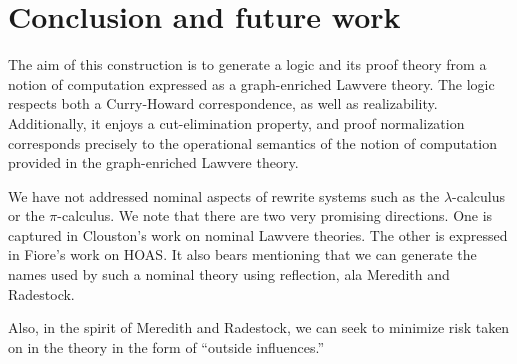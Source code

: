 \documentclass{llncs}
\renewcommand{\:}{\colon}
\newcommand{\pic}{$\pi$-calculus}
\begin{document}











  

\section{Conclusion and future work}

The aim of this construction is to generate a logic and its proof
theory from a notion of computation expressed as a graph-enriched
Lawvere theory. The logic respects both a Curry-Howard correspondence,
as well as realizability. Additionally, it enjoys a cut-elimination
property, and proof normalization corresponds precisely to the
operational semantics of the notion of computation provided in the
graph-enriched Lawvere theory.

We have not addressed nominal aspects of rewrite systems such as the
$\lambda$-calculus or the {\pic}. We note that there are two very
promising directions. One is captured in Clouston’s work on nominal
Lawvere theories. The other is expressed in Fiore’s work on HOAS. It
also bears mentioning that we can generate the names used by such a
nominal theory using reflection, ala Meredith and Radestock.

Also, in the spirit of Meredith and Radestock, we can seek to minimize
risk taken on in the theory in the form of “outside influences.”




\end{document}
